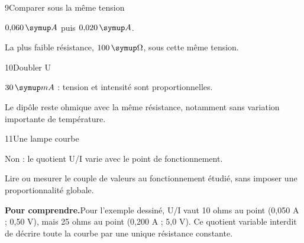 \par\noindent\begin{minipage}{\linewidth}
\begin{corrige}{9}{Comparer sous la même tension}
\begin{questions}
\item $0{,}060\unite A$ puis $0{,}020\unite A$.
\item La plus faible résistance, $100\unite\Omega$, sous cette même tension.
\end{questions}
\end{corrige}
\end{minipage}
\par\noindent\begin{minipage}{\linewidth}
\begin{corrige}{10}{Doubler U}
\begin{questions}
\item $30\unite{mA}$ : tension et intensité sont proportionnelles.
\item Le dipôle reste ohmique avec la même résistance, notamment sans variation importante de température.
\end{questions}
\end{corrige}
\end{minipage}
\par\noindent\begin{minipage}{\linewidth}
\begin{corrige}{11}{Une lampe courbe}
\begin{questions}
\item Non : le quotient U/I varie avec le point de fonctionnement.
\item Lire ou mesurer le couple de valeurs au fonctionnement étudié, sans imposer une proportionnalité globale.
\end{questions}
\par\smallskip\noindent\textbf{Pour comprendre.}\enspace Pour l’exemple dessiné, U/I vaut 10 ohms au point (0,050 A ; 0,50 V), mais 25 ohms au point (0,200 A ; 5,0 V). Ce quotient variable interdit de décrire toute la courbe par une unique résistance constante.\par
{}
\end{corrige}
\end{minipage}
